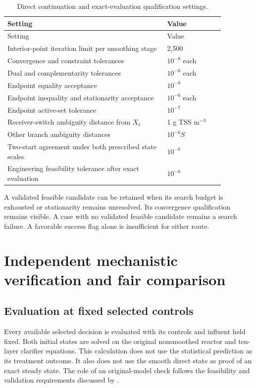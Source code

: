 \begin{longtable}{p{0.64\linewidth}p{0.23\linewidth}}
\caption{Direct continuation and exact-evaluation qualification settings.}\label{tab:plant_direct_settings}\\
\toprule Setting & Value\\\midrule\endfirsthead
\toprule Setting & Value\\\midrule\endhead
Interior-point iteration limit per smoothing stage & 2{,}500\\
Convergence and constraint tolerances & $10^{-8}$ each\\
Dual and complementarity tolerances & $10^{-6}$ each\\
Endpoint equality acceptance & $10^{-8}$\\
Endpoint inequality and stationarity acceptance & $10^{-6}$ each\\
Endpoint active-set tolerance & $10^{-7}$\\
Receiver-switch ambiguity distance from $X_t$ & 1 g TSS m$^{-3}$\\
Other branch ambiguity distances & $10^{-6}S$\\
Two-start agreement under both prescribed state scales & $10^{-6}$\\
Engineering feasibility tolerance after exact evaluation & $10^{-6}$\\
\bottomrule
\end{longtable}

A validated feasible candidate can be retained when its search budget is exhausted or stationarity remains unresolved. Its convergence qualification remains visible. A case with no validated feasible candidate remains a search failure. A favorable success flag alone is insufficient for either route.

\section{Independent mechanistic verification and fair comparison}

\subsection{Evaluation at fixed selected controls}

Every available selected decision is evaluated with its controls and influent held fixed. Both initial states are solved on the original nonsmoothed reactor and ten-layer clarifier equations. This calculation does not use the statistical prediction as its treatment outcome. It also does not use the smooth direct state as proof of an exact steady state. The role of an original-model check follows the feasibility and validation requirements discussed by \citet{BhosekarIerapetritou2018}.

